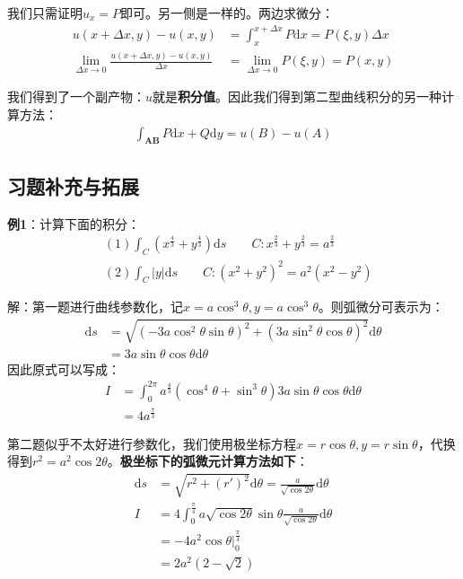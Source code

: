 \documentclass{ctexart}
\let\oldtextbf\textbf
\renewcommand{\textbf}[1]{\textcolor{brown!50!red}{\oldtextbf{#1}}}
\begin{document}
我们只需证明$u_x=P$即可。另一侧是一样的。两边求微分：
\begin{align*}
u(x+\Delta x,y)-u(x,y)&=\int_x^{x+\Delta x}P\mathrm{d}x=P(\xi,y)\Delta x\\  
\lim_{\Delta x\to 0} \frac{u(x+\Delta x,y)-u(x,y)}{\Delta x}&=\lim_{\Delta x\to 0} P(\xi,y)=P(x,y)
\end{align*}

我们得到了一个副产物：$u$就是\textbf{\color{brown!50!red}积分值}。因此我们得到第二型曲线积分的另一种计算方法：
\begin{align*}
\int_{\bm{AB}}P\mathrm{d}x+Q\mathrm{d}y=u(B)-u(A)\tag{2-15} 
\end{align*}

\subsection{习题补充与拓展}
\textbf{\color{brown!50!red}例1}：计算下面的积分：
\begin{align*}
&(1)\int_C (x^{\frac{4}{3} }+y^{\frac{4}{3} })\mathrm{d}s \qquad 
C:x^{\frac{2}{3} }+y^{\frac{2}{3} }=a^\frac{2}{3}\\ 
&(2)\int_C |y|\mathrm{d}s\qquad C:(x^2+y^2)^2=a^2(x^2-y^2) 
\end{align*}

解：第一题进行曲线参数化，记$x=a\cos^3\theta,y=a\cos^3\theta$。则弧微分可表示为：
\begin{align*}
\mathrm{d}s&=\sqrt{(-3a\cos^2\theta\sin\theta)^2+(3a\sin^2\theta\cos\theta)^2}\mathrm{d}\theta \\
&=3a\sin\theta\cos\theta\mathrm{d}\theta 
\end{align*}
因此原式可以写成：
\begin{align*}
I&=\int_0^{2\pi}a^{\frac{4}{3} }(\cos^4\theta+\sin^3\theta)3a\sin\theta\cos\theta\mathrm{d}\theta \\
&=4a^{\frac{7}{3}}
\end{align*}

第二题似乎不太好进行参数化，我们使用极坐标方程$x=r\cos\theta,y=r\sin\theta$，代换得到$r^2=a^2\cos{2\theta}$。\textbf{\color{brown!50!red}极坐标下的弧微元计算方法如下}：
\begin{align*}
\mathrm{d}s&=\sqrt{r^2+(r')^2}\mathrm{d}\theta = \frac{a}{\sqrt{\cos 2\theta}}\mathrm{d}\theta\tag{2-16}  \\
I&=4\int_0^{\frac{\pi}{4} }a\sqrt{\cos2\theta}\sin\theta\frac{a}{\sqrt{\cos 2\theta}}\mathrm{d}\theta\\
&=-4a^2\cos\theta|_0^{\frac{\pi}{4} }\\
&=2a^2(2-\sqrt{2})
\end{align*}
\end{document}
